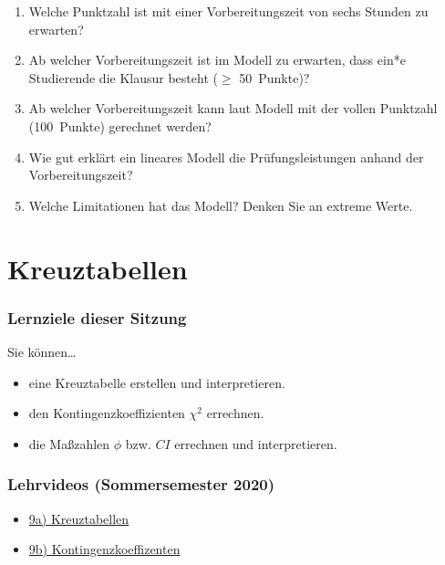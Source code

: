 \documentclass[
  11pt,
  ngerman,
  a4paper,
]{report}
\providecommand{\tightlist}{%
  \setlength{\itemsep}{0pt}\setlength{\parskip}{0pt}}
\begin{document}
\begin{enumerate}
\def\labelenumi{\alph{enumi})}
\item
  Welche Punktzahl ist mit einer Vorbereitungszeit von sechs Stunden zu erwarten?
\item
  Ab welcher Vorbereitungszeit ist im Modell zu erwarten, dass ein*e Studierende die Klausur besteht (\(\geq\) 50~Punkte)?
\item
  Ab welcher Vorbereitungszeit kann laut Modell mit der vollen Punktzahl (100~Punkte) gerechnet werden?
\item
  Wie gut erklärt ein lineares Modell die Prüfungsleistungen anhand der Vorbereitungszeit?
\item
  Welche Limitationen hat das Modell? Denken Sie an extreme Werte.
\end{enumerate}

\hypertarget{kreuztabellen}{%
\chapter{Kreuztabellen}\label{kreuztabellen}}

\hypertarget{lernziele-dieser-sitzung-8}{%
\subsection*{Lernziele dieser Sitzung}\label{lernziele-dieser-sitzung-8}}

Sie können\ldots{}

\begin{itemize}
\tightlist
\item
  eine Kreuztabelle erstellen und interpretieren.
\item
  den Kontingenzkoeffizienten \(\chi^2\) errechnen.
\item
  die Maßzahlen \(\phi\) bzw. \(\mathit{CI}\) errechnen und interpretieren.
\end{itemize}

\hypertarget{lehrvideos-sommersemester-2020-5}{%
\subsection*{Lehrvideos (Sommersemester 2020)}\label{lehrvideos-sommersemester-2020-5}}

\begin{itemize}
\tightlist
\item
  \href{https://video01.uni-frankfurt.de/Mediasite/Play/24a54089cd474c5f936a2dfeecfc43281d}{9a) Kreuztabellen}
\item
  \href{https://video01.uni-frankfurt.de/Mediasite/Play/007a5399d62a4e27a09e1e31e9b04e461d}{9b) Kontingenzkoeffizenten}
\end{itemize}
\end{document}
